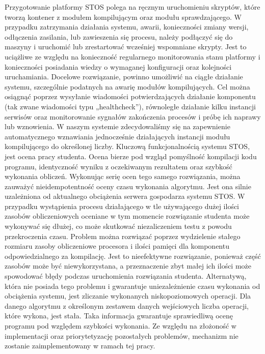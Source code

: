\newline \indent Przygotowanie platformy STOS polega na ręcznym uruchomieniu skryptów, które tworzą kontener z modułem kompilującym oraz modułu sprawdzającego. W przypadku zatrzymania działania systemu, awarii, konieczności zmiany wersji, odłączenia zasilania, lub zawieszenia się procesu, należy podłączyć się do maszyny i uruchomić lub zrestartować wcześniej wspomniane skrypty. Jest to uciążliwe ze względu na konieczność regularnego monitorowania stanu platformy i konieczności posiadania wiedzy o wymaganej konfiguracji oraz kolejności uruchamiania. Docelowe rozwiązanie, powinno umożliwić na ciągłe działanie systemu, szczególnie podatnych na awarię modułów kompilujących. Cel można osiągnąć poprzez wysyłanie wiadomości potwierdzających działanie komponentu (tak zwane wiadomości typu „healthcheck”), równoległe działanie kilku instancji serwisów oraz monitorowanie sygnałów zakończenia procesów i próbę ich naprawy lub wznowienia. W naszym systemie zdecydowaliśmy się na zapewnienie automatycznego wznawiania jednocześnie działających instancji modułu kompilującego do określonej liczby.
\newline \indent Kluczową funkcjonalnością systemu STOS, jest ocena pracy studenta. Ocena bierze pod wzgląd pomyślność kompilacji kodu programu, identyczność wyniku z oczekiwanym rezultatem oraz szybkość wykonania obliczeń. Wykonując serię ocen tego samego rozwiązania, można zauważyć nieidempotentność oceny czasu wykonania algorytmu. Jest ona silnie uzależniona od aktualnego obciążenia serwera gospodarza systemu STOS. W przypadku wystąpienia procesu działającego w tle używającego dużej ilości zasobów obliczeniowych oceniane w tym momencie rozwiązanie studenta może wykonywać się dłużej, co może skutkować niezaliczeniem testu z powodu przekroczenia czasu. Problem można rozwiązać poprzez wydzielenie stałego rozmiaru zasoby obliczeniowe procesora i ilości pamięci dla komponentu odpowiedzialnego za kompilację. Jest to nieefektywne rozwiązanie, ponieważ część zasobów może być niewykorzystana, a przeznaczenie zbyt małej ich ilości może spowodować błędy podczas uruchomienia rozwiązania studenta. Alternatywą, która nie posiada tego problemu i gwarantuje uniezależnienie czasu wykonania od obciążenia systemu, jest zliczanie wykonanych niskopoziomowych operacji. Dla danego algorytmu z określonym zestawem danych wejściowych liczba operacji, które wykona, jest stała. Taka informacja gwarantuje sprawiedliwą ocenę programu pod względem szybkości wykonania. Ze względu na złożoność w implementacji oraz priorytetyzację pozostałych problemów, mechanizm nie zostanie zaimplementowany w ramach tej pracy.